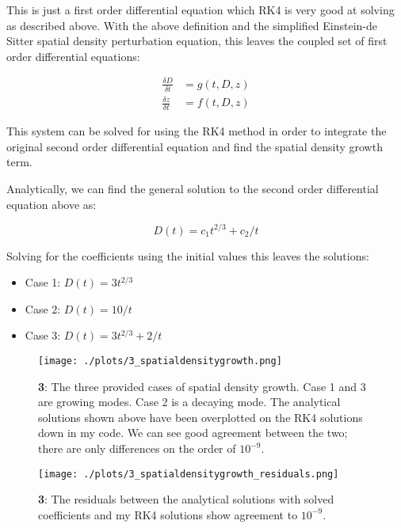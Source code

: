 This is just a first order differential equation which RK4 is very good at solving as described above. With the above definition and the simplified Einstein-de Sitter spatial density perturbation equation, this leaves the coupled set of first order differential equations:

\begin{align*}
  \frac{\delta D}{\delta t} &= g(t,D,z)\\
  \frac{\delta z}{\delta t} &= f(t,D,z)
\end{align*}


This system can be solved for using the RK4 method in order to integrate the original second order differential equation and find the spatial density growth term.

Analytically, we can find the general solution to the second order differential equation above as:

\begin{equation}
  D(t) = c_1t^{2/3}+c_2/t
\end{equation}

Solving for the coefficients using the initial values this leaves the solutions:

\begin{itemize}
  \item Case 1: $D(t) = 3t^{2/3}$ 
  \item Case 2: $D(t) =10/t$
  \item Case 3: $D(t) =  3t^{2/3}+ 2/t$
  \end{itemize}



\begin{figure}[h!]
  \centering
  \texttt{[image: ./plots/3\_spatialdensitygrowth.png]}
  \caption{\textbf{3}: The three provided cases of spatial density growth. Case 1 and 3 are growing modes. Case 2 is a decaying mode. The analytical solutions shown above have been overplotted on the RK4 solutions down in my code. We can see good agreement between the two; there are only differences on the order of $10^{-9}$.}
  \label{fig:spatialdensitygrowth}
\end{figure}


\begin{figure}[h!]
  \centering
  \texttt{[image: ./plots/3\_spatialdensitygrowth\_residuals.png]}
  \caption{\textbf{3}: The residuals between the analytical solutions with solved coefficients and my RK4 solutions show agreement to $10^{-9}$.}
  \label{fig:spatialdensitygrowthresiduals}
\end{figure}


